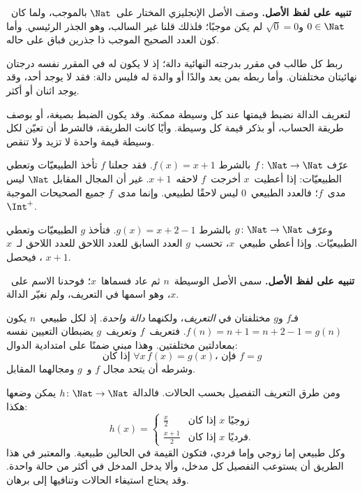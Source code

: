 \documentclass[../../../include/open-logic-section]{subfiles}
\begin{document}
\begin{explain}
\textbf{تنبيه على لفظ الأصل.} وصف الأصل الإنجليزي المختار على~$\Nat$
بالموجب، ولما كان~$0\in\Nat$ و$\sqrt{0}=0$ لم يكن موجبًا؛ فلذلك قلنا غير السالب، وهو الجذر
الرئيسي. وأما كون العدد الصحيح الموجب ذا جذرين فباق على حاله.
\end{explain}

\begin{ex}
ربط كل طالب في مقرر بدرجته النهائية دالة؛ إذ لا يكون له في المقرر
نفسه درجتان نهائيتان مختلفتان. وأما ربطه بمن يعد والدًا أو والدة
له فليس دالة: فقد لا يوجد أحد، وقد يوجد اثنان أو أكثر.
\end{ex}

\begin{explain}
لتعريف الدالة نضبط قيمتها عند كل وسيطة ممكنة. وقد يكون الضبط بصيغة،
أو بوصف طريقة الحساب، أو بذكر قيمة كل وسيطة. وأيًا كانت الطريقة،
فالشرط أن تعيّن لكل وسيطة قيمة واحدة لا تزيد ولا تنقص.
\end{explain}

\begin{ex}
عرّف $f \colon \Nat \to \Nat$ بالشرط $f(x) = x+1$.
فقد جعلنا $f$ تأخذ الطبيعيّات وتعطي الطبيعيّات: إذا أعطيت~$x$
أخرجت~$f$ لاحقه~$x+1$. غير أن المجال المقابل $\Nat$ ليس
مدى~$f$؛ فالعدد الطبيعي~$0$ ليس لاحقًا لطبيعي. وإنما مدى~$f$
جميع الصحيحات الموجبة $\Int^{+}$.
\end{ex}

\begin{ex}
وعرّف $g \colon \Nat \to \Nat$ بالشرط $g(x) = x+2-1$.
فتأخذ $g$ الطبيعيّات وتعطي الطبيعيّات. وإذا أعطي طبيعي~$x$،
تحسب~$g$ العدد السابق للعدد اللاحق للعدد اللاحق لـ~$x$،
فيحصل $x+1$.
\end{ex}

\begin{explain}
\textbf{تنبيه على لفظ الأصل.} سمى الأصل الوسيطة~$n$ ثم عاد فسماها~$x$؛
فوحدنا الاسم على~$x$، وهو اسمها في التعريف، ولم نغيّر الدالة.
\end{explain}

\begin{explain}
فـ$f$ و$g$ مختلفتان في \emph{التعريف}، ولكنهما \emph{دالة واحدة}.
إذ لكل طبيعي~$n$ يكون $f(n) = n+1 = n+2-1 =
g(n)$. فتعريف~$f$ وتعريف~$g$ يضبطان التعيين نفسه بمعادلتين
مختلفتين. وهذا مبني ضمنًا على امتدادية الدوال:
\[
  \text{إذا كان }\forall x\, f(x) = g(x)\text{، فإن }f = g
\]
وشرطه أن يتحد مجال $f$ و~$g$ ومجالهما المقابل.
\end{explain}

\begin{ex}
ومن طرق التعريف التفصيل بحسب الحالات. فالدالة
$h \colon \Nat \to \Nat$ يمكن وضعها هكذا:
\[
h(x) =
\begin{cases}
  \frac{x}{2} & \text{إذا كان $x$ زوجيًا} \\
  \frac{x+1}{2} & \text{إذا كان $x$ فرديًا.}
\end{cases}
\]
وكل طبيعي إما زوجي وإما فردي، فتكون القيمة في الحالين طبيعية.
والمعتبر في هذا الطريق أن يستوعب التفصيل كل مدخل، وألا يدخل
المدخل في أكثر من حالة واحدة. وقد يحتاج استيفاء الحالات
وتنافيها إلى برهان.
\end{ex}
\end{document}
